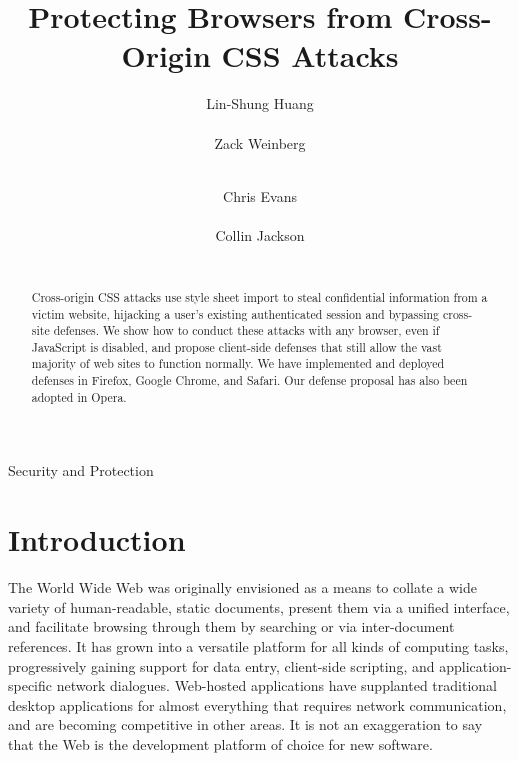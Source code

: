 \documentclass{acm_proc_article-sp}
\begin{document}
\title{Protecting Browsers from Cross-Origin CSS Attacks}
\author{
\alignauthor
Lin-Shung Huang\\
      \\
\alignauthor
Zack Weinberg\\
      \\
\and
\alignauthor
Chris Evans\\
      \\
\alignauthor
Collin Jackson\\
      \\
}

\newcommand{\todo}[1]{\textbf{[TODO: #1]}}

\maketitle
\begin{abstract}
Cross-origin CSS attacks use style sheet import to steal confidential
information from a victim website, hijacking a user's existing
authenticated session and bypassing cross-site defenses.  We show how
to conduct these attacks with any browser, even if JavaScript is
disabled, and propose client-side defenses that still allow the vast
majority of web sites to function normally. We have implemented and
deployed defenses in Firefox, Google Chrome, and Safari. Our defense
proposal has also been adopted in Opera.
\end{abstract}

                {Security and Protection}



\section{Introduction}

The World Wide Web was originally envisioned \cite{wwwproposal} as a
means to collate a wide variety of human-readable, static documents,
present them via a unified interface, and facilitate browsing through
them by searching or via inter-document references. It has grown into
a versatile platform for all kinds of computing tasks, progressively
gaining support for data entry, client-side scripting, and
application-specific network dialogues.  Web-hosted applications have
supplanted traditional desktop applications for almost everything that
requires network communication, and are becoming competitive in other
areas.  It is not an exaggeration to say that the Web is the
development platform of choice for new software.
\end{document}
